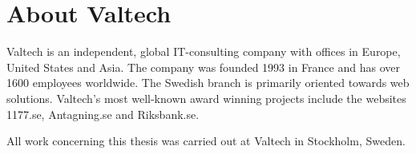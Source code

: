 \section{About Valtech}
Valtech is an independent, global IT-consulting company with offices in Europe, United States and Asia. The company was founded 1993 in France and has over 1600 employees worldwide. The Swedish branch is primarily oriented towards web solutions. 
Valtech's most well-known award winning projects include the websites 1177.se, Antagning.se and Riksbank.se. 

All work concerning this thesis was carried out at Valtech in Stockholm, Sweden.